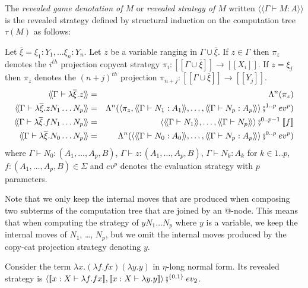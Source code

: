 \documentclass{llncs}
\newcommand{\lsem}{[\![} %
\newcommand{\rsem}{]\!]} %
\newcommand{\sem}[1]{{\lsem #1 \rsem}}
\newcommand{\intersem}[1]{{\langle\!\langle #1 \rangle\!\rangle}}
\newcommand\union{\cup}
\begin{document}
\begin{definition}
\label{dfn:interactionstrategy_ofterms}
The \emph{revealed game denotation of $M$} or \emph{revealed
strategy of $M$} written $\intersem{\Gamma \vdash M : A}$ is the
revealed strategy defined by structural induction on the computation
tree $\tau(M)$ as follows:

Let $\overline{\xi} = \xi_1 : Y_1, \ldots \xi_n : Y_n$.
Let $z$ be a variable ranging in $\Gamma \union \overline{\xi}$. If $z\in \Gamma$ then $\pi_{z}$ denotes
the $i^{th}$ projection copycat strategy $\pi_i : \sem{\Gamma \union \overline{\xi}} \rightarrow \sem{X_i}$. If $z = \xi_j$ then
$\pi_{z}$ denotes the $(n+j)^{th}$ projection $\pi_{n+j} : \sem{\Gamma \union \overline{\xi}} \rightarrow \sem{Y_j}$.
\begin{eqnarray*}
 \intersem{\Gamma \vdash \lambda \overline{\xi} . z } &=& \Lambda^n(\pi_{z})  \\
 \intersem{\Gamma \vdash \lambda \overline{\xi} . z N_1 \ldots N_p} &=& \Lambda^n(\langle \pi_z, \intersem{\Gamma \vdash N_1 : A_1}, \ldots, \intersem{\Gamma \vdash N_p : A_p}  \rangle \fatsemi ^{1..p} ev^p) \\
\intersem{\Gamma \vdash \lambda \overline{\xi}. f N_1 \ldots N_p} &=& \langle \intersem{\Gamma \vdash N_1}, \ldots, \intersem{\Gamma \vdash N_p} \rangle \fatsemi^{0..p-1} \sem{f} \\
 \intersem{\Gamma \vdash \lambda \overline{\xi} . N_0 \ldots N_p} &=& \Lambda^n(\langle \intersem{\Gamma \vdash N_0 : A_0}, \ldots, \intersem{\Gamma \vdash N_p : A_p}  \rangle \fatsemi^{0..p} ev^p)
\end{eqnarray*}
where $\Gamma \vdash N_0 : (A_1,\ldots,A_p,B)$, $\Gamma \vdash z : (A_1,\ldots,A_p,B)$, $\Gamma \vdash N_k : A_k$ for $k\in 1..p$,
$f : (A_1,\ldots,A_p,B) \in \Sigma$ and $ev^p$ denotes the evaluation strategy with $p$ parameters.
\end{definition}
Note that we only keep the internal
moves that are produced when composing two subterms of the computation tree that are joined by an @-node.
This means that when computing the strategy of
$y N_1 \ldots N_p$ where $y$ is a variable, we keep the internal moves of $N_1$, \ldots, $N_p$, but
we omit the internal moves produced by the copy-cat projection strategy denoting $y$.



\begin{example}
Consider the term $\lambda x . (\lambda f . f x) (\lambda y . y)$ in $\eta$-long normal form.
Its revealed strategy is $\langle \sem{ x:X \vdash \lambda f . f
x} , \sem{ x:X \vdash \lambda y . y} \rangle \fatsemi^{\{0,1\}} ev_2$.
\end{example}
\end{document}
